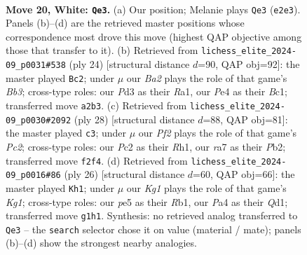 \documentclass[11pt]{article}
\begin{document}
\clearpage

\begin{figure}[p]\centering
\begin{subfigure}{0.46\textwidth}\centering
\resizebox{\linewidth}{!}{%
\newchessgame
\chessboard[
  setfen={2bqn1r1/r3bpk1/p2p2p1/n1p1p2p/Pp2P3/3P3N/BPPBQPPP/RN2R1K1 w - - 0 20},
  showmover=false,
  pgfstyle=straightmove, color=movearrow, markmove={e2-e3}
]}
\caption{}
\end{subfigure}\hfill
\begin{subfigure}{0.46\textwidth}\centering
\resizebox{\linewidth}{!}{%
\newchessgame
\chessboard[
  setfen={r1bq1rk1/1p3pp1/n1pb3p/p3p3/P3P1n1/1BP2N2/1P3PPP/RNBQ1RK1 w - - 6 13},
  showmover=false,
  pgfstyle=straightmove, color=movearrow, markmove={b3-c2}
]}
\caption{}
\end{subfigure}
\\[4pt]
\begin{subfigure}{0.46\textwidth}\centering
\resizebox{\linewidth}{!}{%
\newchessgame
\chessboard[
  setfen={r1b1k2r/2q1ppb1/pn3np1/2p3Np/1p2P2P/3BBP2/PPPQN1P1/1K1R3R w kq - 0 15},
  showmover=false,
  pgfstyle=straightmove, color=movearrow, markmove={c2-c3}
]}
\caption{}
\end{subfigure}\hfill
\begin{subfigure}{0.46\textwidth}\centering
\resizebox{\linewidth}{!}{%
\newchessgame
\chessboard[
  setfen={r1bq1rk1/1p4bp/n1p2p1n/p2pp1p1/8/2PP2PN/PPNBPPBP/1R1Q1RK1 w - - 0 14},
  showmover=false,
  pgfstyle=straightmove, color=movearrow, markmove={g1-h1}
]}
\caption{}
\end{subfigure}
\caption{\textbf{Move 20, White: \texttt{Qe3}.} (a) Our position; Melanie plays \texttt{Qe3} (\texttt{e2e3}). Panels (b)--(d) are the retrieved master positions whose correspondence most drove this move (highest QAP objective among those that transfer to it). (b) Retrieved from \texttt{lichess\_elite\_2024-09\_p0031\#538} (ply 24) [structural distance $d$=90, QAP obj=92]: the master played \texttt{Bc2}; under $\mu$ our \emph{Ba2} plays the role of that game's \emph{Bb3}; cross-type roles: our \emph{P}d3 as their \emph{R}a1, our \emph{P}e4 as their \emph{B}c1; transferred move \texttt{a2b3}. (c) Retrieved from \texttt{lichess\_elite\_2024-09\_p0030\#2092} (ply 28) [structural distance $d$=88, QAP obj=81]: the master played \texttt{c3}; under $\mu$ our \emph{Pf2} plays the role of that game's \emph{Pc2}; cross-type roles: our \emph{P}c2 as their \emph{R}h1, our \emph{r}a7 as their \emph{P}b2; transferred move \texttt{f2f4}. (d) Retrieved from \texttt{lichess\_elite\_2024-09\_p0016\#86} (ply 26) [structural distance $d$=60, QAP obj=66]: the master played \texttt{Kh1}; under $\mu$ our \emph{Kg1} plays the role of that game's \emph{Kg1}; cross-type roles: our \emph{p}e5 as their \emph{R}b1, our \emph{P}a4 as their \emph{Q}d1; transferred move \texttt{g1h1}. Synthesis: no retrieved analog transferred to \texttt{Qe3} -- the \texttt{search} selector chose it on value (material / mate); panels (b)--(d) show the strongest nearby analogies.}
\label{fig:thought-m38}
\end{figure}
\end{document}
